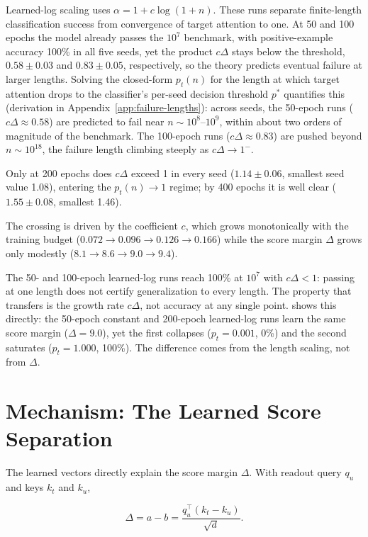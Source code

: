 \documentclass{article}
\begin{document}
Learned-log scaling uses $\alpha=1+c\log(1+n)$. These runs separate
finite-length classification success from convergence of target attention to
one. At 50 and 100 epochs the model
  already passes the $10^7$ benchmark, with positive-example accuracy 100\% in all
five seeds, yet the product $c\Delta$ stays below the threshold,
$0.58\pm0.03$ and $0.83\pm0.05$, respectively, so the theory predicts eventual
failure at larger lengths. Solving the closed-form $p_t(n)$ for the length at
which target attention drops to the classifier's per-seed decision threshold
$p^{\ast}$ quantifies this (derivation in Appendix~\ref{app:failure-lengths}): across
seeds, the 50-epoch runs ($c\Delta\approx0.58$) are predicted to fail near
$n\sim10^8$--$10^9$, within about two orders of magnitude of the benchmark. The
100-epoch runs ($c\Delta\approx0.83$) are pushed beyond $n\sim10^{18}$, the
  failure length climbing steeply as $c\Delta\to1^{-}$.

Only at 200 epochs does $c\Delta$ exceed 1 in every seed
  ($1.14\pm0.06$, smallest seed value 1.08), entering the $p_t(n)\to1$ regime;
  by 400 epochs it is well clear ($1.55\pm0.08$, smallest 1.46).

The crossing is driven by the coefficient $c$,
which grows monotonically with the training budget
($0.072\to0.096\to0.126\to0.166$) while the score margin $\Delta$ grows only
modestly ($8.1\to8.6\to9.0\to9.4$).

The 50- and 100-epoch learned-log runs reach 100\% at $10^7$ with $c\Delta<1$:
passing at one length does not certify generalization to every length. The
property that transfers is the growth rate $c\Delta$, not accuracy at any single
point.  shows this directly: the 50-epoch constant and
200-epoch learned-log runs learn the same score margin ($\Delta=9.0$), yet the
first collapses ($p_t=0.001$, 0\%) and the second saturates ($p_t=1.000$,
100\%). The difference comes from the length scaling, not from $\Delta$.

\section{Mechanism: The Learned Score Separation}
\label{sec:mechanism}

The learned vectors directly explain the score margin $\Delta$. With readout
query $q_u$ and keys $k_t$ and $k_u$,

\begin{equation}
  \Delta
  =a-b
  =\frac{q_u^\top(k_t-k_u)}{\sqrt{d}}.
  \label{eq:mechanism-margin}
\end{equation}
\end{document}
